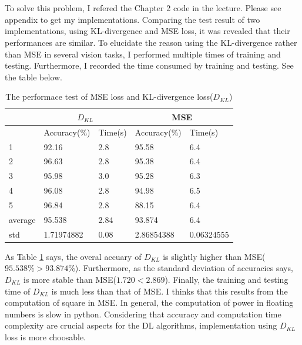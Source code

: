 \documentclass[10pt]{article}
\begin{document}
\section{}
To solve this problem, I refered the Chapter 2 code in the lecture. Please see appendix to get my implementations.
Comparing the test result of two implementations, using KL-divergence and MSE loss, it was revealed that their performances are similar. 
To elucidate the reason using the KL-divergence rather than MSE in several vision tasks, I performed multiple times of training and testing. Furthermore, I recorded the time consumed by training and testing.
See the table below.

\begin{table}[!h]
    \begin{center}
        \begin{tabular}{lllll}
            & \multicolumn{2}{c}{$D_{KL}$} \vline & \multicolumn{2}{c}{MSE} \\
            \hline \hline
            & Accuracy(\%)    & Time(s)         & Accuracy(\%)  & Time(s)        \\
    1       & 92.16       & 2.8         & 95.58     & 6.4         \\
    2       & 96.63       & 2.8         & 95.38     & 6.4         \\
    3       & 95.98       & 3.0           & 95.28     & 6.3         \\
    4       & 96.08       & 2.8         & 94.98     & 6.5         \\
    5       & 96.84       & 2.8         & 88.15     & 6.4         \\
    \hline 
    average & 95.538      & 2.84        & 93.874    & 6.4         \\
    std     & 1.71974882  & 0.08 & 2.86854388      & 0.06324555 
    \end{tabular}
    \end{center}
    \caption{The performace test of MSE loss and KL-divergence loss($D_{KL}$)}
    \label{tab1}
\end{table}
As Table \ref{tab1} says, the overal accuary of $D_{KL}$ is slightly higher than MSE($95.538\% > 93.874\%$).
Furthermore, as the standard deviation of accuracies says, $D_{KL}$ is more stable than MSE($1.720< 2.869$). 
Finally, the training and testing time of $D_{KL}$ is much less than that of MSE. I thinks that this results from the computation of square in MSE. In general, the computation of power in floating numbers is slow in python.
Considering that accuracy and computation time complexity are crucial aspects for the DL algorithms, implementation using $D_{KL}$ loss is more choosable. 
\end{document}
